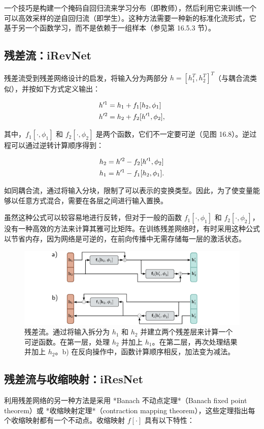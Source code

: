 一个技巧是构建一个掩码自回归流来学习分布（即教师），然后利用它来训练一个可以高效采样的逆自回归流（即学生）。这种方法需要一种新的标准化流形式，它基于另一个函数学习，而不是依赖于一组样本（参见第 16.5.3 节）。

\subsection{残差流：iRevNet}
残差流受到残差网络设计的启发，将输入分为两部分 \(h = [h^T_1, h^T_2]^T\)（与耦合流类似），并按如下方式定义输出：

\begin{align}
&h'^1 = h_1 + f_1[h_2, \phi_1] \notag \\
&h'^2 = h_2 + f_2[h'^1, \phi_2], 
\end{align} 


其中，\(f_1[\cdot, \phi_1]\) 和 \(f_2[\cdot, \phi_2]\) 是两个函数，它们不一定要可逆（见图 16.8）。逆过程可以通过逆转计算顺序得到：


\begin{align}
&h_2 = h'^2 - f_2[h'^1, \phi_2] \notag \\
&h_1 = h'^1 - f_1[h_2, \phi_1]. 
\end{align} 


如同耦合流，通过将输入分块，限制了可以表示的变换类型。因此，为了使变量能够以任意方式混合，需要在各层之间进行输入置换。

虽然这种公式可以较容易地进行反转，但对于一般的函数 \(f_1[\cdot, \phi_1]\) 和 \(f_2[\cdot, \phi_2]\)，没有一种高效的方法来计算其雅可比矩阵。在训练残差网络时，有时采用这种公式以节省内存，因为网络是可逆的，在前向传播中无需存储每一层的激活状态。

\begin{figure}[ht!]
\centering
\includegraphics[width=0.7\linewidth]{png/chapter16/FlowResidual.png}
\caption{残差流。通过将输入拆分为 \(h_1\) 和 \(h_2\) 并建立两个残差层来计算一个可逆函数。在第一层，处理 \(h_2\) 并加上 \(h_1\)。在第二层，再次处理结果并加上 \(h_2\)。b) 在反向操作中，函数计算顺序相反，加法变为减法。}
\end{figure}


\subsection{残差流与收缩映射：iResNet}
利用残差网络的另一种方法是采用 *Banach 不动点定理*（Banach fixed point theorem）或 *收缩映射定理*（contraction mapping theorem），这些定理指出每个收缩映射都有一个不动点。收缩映射 \(f[\cdot]\) 具有以下特性：

